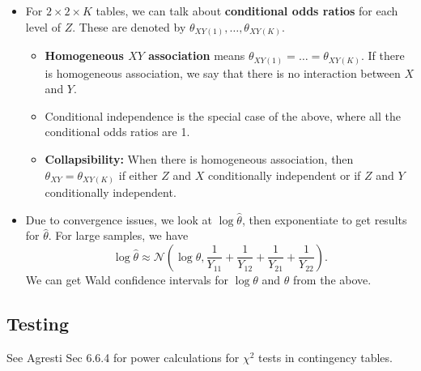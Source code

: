 \documentclass[twoside]{article}
\newcommand\calN{\mathcal{N}}
\def\t{\theta}
\begin{document}
\begin{itemize}
\begin{itemize}
\item For $2 \times 2 \times K$ tables, we can talk about \textbf{conditional odds ratios} for each level of $Z$. These are denoted by $\t_{XY(1)}, \dots, \t_{XY(K)}$.
\begin{itemize}
\item \textbf{Homogeneous $XY$ association} means $\t_{XY(1)} = \dots = \t_{XY(K)}$. If there is homogeneous association, we say that there is no interaction between $X$ and $Y$.
\item Conditional independence is the special case of the above, where all the conditional odds ratios are 1.
\item \textbf{Collapsibility:} When there is homogeneous association, then $\t_{XY} = \t_{XY(K)}$ if either $Z$ and $X$ conditionally independent or if $Z$ and $Y$ conditionally independent.
\end{itemize}

\item Due to convergence issues, we look at $\log \hat{\t}$, then exponentiate to get results for $\hat{\t}$. For large samples, we have
\begin{equation*} \log \hat{\t} \approx \calN \left( \log \t, \frac{1}{Y_{11}} + \frac{1}{Y_{12}} + \frac{1}{Y_{21}} + \frac{1}{Y_{22}}  \right). \end{equation*}
We can get Wald confidence intervals for $\log \t$ and $\t$ from the above.

\end{itemize}

\end{itemize}

\subsection{Testing}
See Agresti Sec 6.6.4 for power calculations for $\chi^2$ tests in contingency tables.
\end{document}
